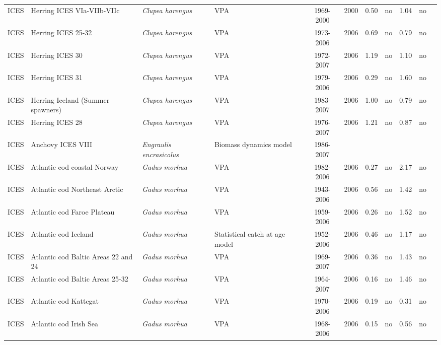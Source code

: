\begin{longtable}{p{1.8cm}p{3.5cm}p{3.5cm}p{3cm}cccp{0.9cm}cp{0.9cm}c}
  ICES & Herring ICES VIa-VIIb-VIIc & \textit{Clupea harengus} & VPA & 1969-2000 & 2000 & 0.50 & no & 1.04 & no & \cite{ICES-HAWG-2007.pdf} \\ 
  ICES & Herring ICES 25-32 & \textit{Clupea harengus} & VPA & 1973-2006 & 2006 & 0.69 & no & 0.79 & no & \cite{ICES-WGBFAS-2007.pdf} \\ 
  ICES & Herring ICES 30 & \textit{Clupea harengus} & VPA & 1972-2007 & 2006 & 1.19 & no & 1.10 & no & \cite{ICES-WGBFAS-2007.pdf} \\ 
  ICES & Herring ICES 31 & \textit{Clupea harengus} & VPA & 1979-2006 & 2006 & 0.29 & no & 1.60 & no & \cite{ICES-WGBFAS-2007.pdf} \\ 
  ICES & Herring Iceland (Summer spawners) & \textit{Clupea harengus} & VPA & 1983-2007 & 2006 & 1.00 & no & 0.79 & no & \cite{ICES-NWWG-2007.pdf} \\ 
  ICES & Herring ICES 28 & \textit{Clupea harengus} & VPA & 1976-2007 & 2006 & 1.21 & no & 0.87 & no & \cite{ICES-WGBFAS-2007.pdf} \\ 
  ICES & Anchovy ICES VIII & \textit{Engraulis encrasicolus} & Biomass dynamics model & 1986-2007 &  &  &  &  &  & \cite{ICES-WGMHSA007.pdf} \\ 
  ICES & Atlantic cod coastal Norway & \textit{Gadus morhua} & VPA & 1982-2006 & 2006 & 0.27 & no & 2.17 & no & \cite{ICES-AFWG-2007.pdf} \\ 
  ICES & Atlantic cod Northeast Arctic & \textit{Gadus morhua} & VPA & 1943-2006 & 2006 & 0.56 & no & 1.42 & no & \cite{ICES-AFWG-2007.pdf} \\ 
  ICES & Atlantic cod Faroe Plateau & \textit{Gadus morhua} & VPA & 1959-2006 & 2006 & 0.26 & no & 1.52 & no & \cite{ICES-NWWG-2007.pdf} \\ 
  ICES & Atlantic cod Iceland & \textit{Gadus morhua} & Statistical catch at age model & 1952-2006 & 2006 & 0.46 & no & 1.17 & no & \cite{ICES-NWWG-2007.pdf} \\ 
  ICES & Atlantic cod Baltic Areas 22 and 24 & \textit{Gadus morhua} & VPA & 1969-2007 & 2006 & 0.36 & no & 1.43 & no & \cite{ICES-WGBFAS-2007.pdf} \\ 
  ICES & Atlantic cod Baltic Areas 25-32 & \textit{Gadus morhua} & VPA & 1964-2007 & 2006 & 0.16 & no & 1.46 & no & \cite{ICES-WGBFAS-2007.pdf} \\ 
  ICES & Atlantic cod Kattegat & \textit{Gadus morhua} & VPA & 1970-2006 & 2006 & 0.19 & no & 0.31 & no & \cite{ICES-WGBFAS-2007.pdf} \\ 
  ICES & Atlantic cod Irish Sea & \textit{Gadus morhua} & VPA & 1968-2006 & 2006 & 0.15 & no & 0.56 & no & \cite{ICES-WGNSDS-2007.pdf} \\ 

\end{longtable}
